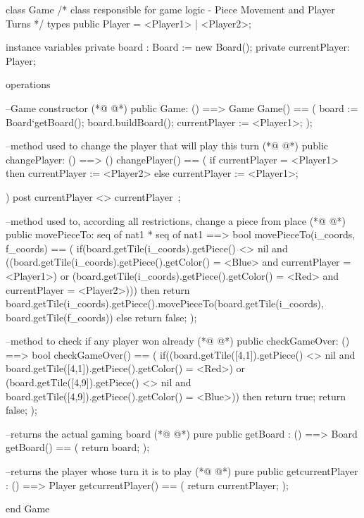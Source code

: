 \begin{vdmpp}[breaklines=true]
class Game
/*
class responsible for game logic - Piece Movement and Player Turns
*/
types
 public Player = <Player1> | <Player2>;

instance variables
 private board : Board := new Board();
 private currentPlayer: Player;
 
operations

  --Game constructor
(*@
\label{Game:15}
@*)
  public Game: () ==> Game
    Game() == (
   board := Board`getBoard();
   board.buildBoard();
   currentPlayer := <Player1>;
    ); 
    
    --method used to change the player that will play this turn
(*@
\label{changePlayer:23}
@*)
    public changePlayer: () ==> ()
    changePlayer() == (
     if currentPlayer = <Player1> then currentPlayer := <Player2>
     else currentPlayer := <Player1>;

    )   
  post currentPlayer <> currentPlayer~;
  
  --method used to, according all restrictions, change a piece from place
(*@
\label{movePieceTo:32}
@*)
  public movePieceTo: seq of nat1 * seq of nat1 ==> bool
    movePieceTo(i_coords, f_coords) == (
     if(board.getTile(i_coords).getPiece() <> nil 
       and ((board.getTile(i_coords).getPiece().getColor() = <Blue> and currentPlayer = <Player1>) or (board.getTile(i_coords).getPiece().getColor() = <Red> and currentPlayer = <Player2>)))
      then return board.getTile(i_coords).getPiece().movePieceTo(board.getTile(i_coords), board.getTile(f_coords))
     else return false;       
    );
  
  --method to check if any player won already
(*@
\label{checkGameOver:41}
@*)
  public checkGameOver: () ==> bool
  checkGameOver() == (
   if((board.getTile([4,1]).getPiece() <> nil and board.getTile([4,1]).getPiece().getColor() = <Red>) or
      (board.getTile([4,9]).getPiece() <> nil and board.getTile([4,9]).getPiece().getColor() = <Blue>))
    then return true;
   return false;
  );
   
   --returns the actual gaming board
(*@
\label{getBoard:50}
@*)
  pure public getBoard : () ==> Board
   getBoard() ==
   (
    return board;
   );
   
   --returns the player whose turn it is to play
(*@
\label{getcurrentPlayer:57}
@*)
   pure public getcurrentPlayer : () ==> Player
   getcurrentPlayer() ==
   (
    return currentPlayer;
   );

end Game
\end{vdmpp}
